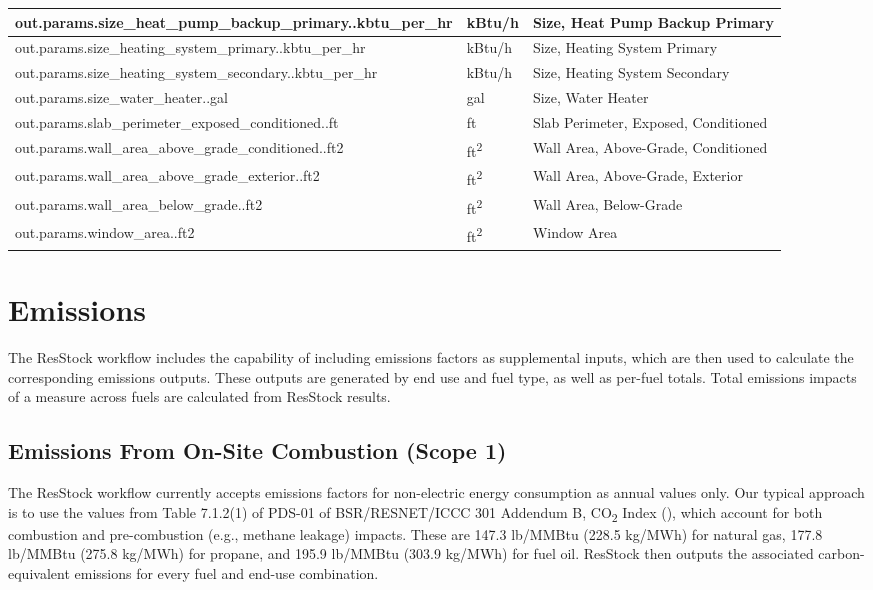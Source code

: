 \begin{longtable}[]{ |p{}|p{2.5cm}|p{6cm}| }
out.params.size\_heat\_pump\_backup\_primary..kbtu\_per\_hr & kBtu/h & Size, Heat Pump Backup Primary \\ \hline
out.params.size\_heating\_system\_primary..kbtu\_per\_hr & kBtu/h & Size, Heating System Primary \\ \hline
out.params.size\_heating\_system\_secondary..kbtu\_per\_hr & kBtu/h & Size, Heating System Secondary \\ \hline
out.params.size\_water\_heater..gal & gal & Size, Water Heater \\ \hline
out.params.slab\_perimeter\_exposed\_conditioned..ft & ft & Slab Perimeter, Exposed, Conditioned \\ \hline
out.params.wall\_area\_above\_grade\_conditioned..ft2 & ft\textsuperscript{2}& Wall Area, Above-Grade, Conditioned \\ \hline
out.params.wall\_area\_above\_grade\_exterior..ft2 & ft\textsuperscript{2}& Wall Area, Above-Grade, Exterior \\ \hline
out.params.wall\_area\_below\_grade..ft2 & ft\textsuperscript{2}& Wall Area, Below-Grade \\ \hline
out.params.window\_area..ft2 & ft\textsuperscript{2}& Window Area
\end{longtable}

\section{Emissions}
The ResStock workflow includes the capability of including emissions factors as supplemental inputs, which are then used to calculate the corresponding emissions outputs. These outputs are generated by end use and fuel type, as well as per-fuel totals. Total emissions impacts of a measure across fuels are calculated from ResStock results.

\subsection{Emissions From On-Site Combustion (Scope 1)}
The ResStock workflow currently accepts emissions factors for non-electric energy consumption as annual values only. Our typical approach is to use the values from Table 7.1.2(1) of PDS-01 of BSR/RESNET/ICCC 301 Addendum B, CO\textsubscript{2} Index (\cite{RESNET2022}), which account for both combustion and pre-combustion (e.g., methane leakage) impacts. These are 147.3 lb/MMBtu (228.5 kg/MWh) for natural gas, 177.8 lb/MMBtu (275.8 kg/MWh) for propane, and 195.9 lb/MMBtu (303.9 kg/MWh) for fuel oil. ResStock then outputs the associated carbon-equivalent emissions for every fuel and end-use combination.

